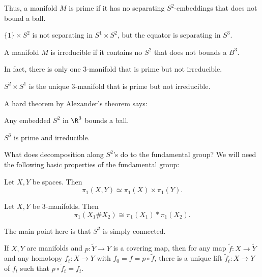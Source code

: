 \documentclass[a4paper]{article}
\begin{document}
Thus, a manifold $M$ is prime if it has no separating $S^2$-embeddings that does not bound a ball.

\begin{eg}
  $\{1\} \times S^2$ is not separating in $S^1 \times S^2$, but the equator is separating in $S^3$.
\end{eg}

\begin{defi}
  A manifold $M$ is irreducible if it contains no $S^2$ that does not bounds a $B^3$.
\end{defi}
In fact, there is only one $3$-manifold that is prime but not irreducible.

\begin{prop}
  $S^2 \times S^1$ is the unique $3$-manifold that is prime but not irreducible.
\end{prop}

A hard theorem by Alexander's theorem says:
\begin{thm}
  Any embedded $S^2$ in $\R^3$ bounds a ball.
\end{thm}

\begin{cor}
  $S^3$ is prime and irreducible.
\end{cor}

What does decomposition along $S^2$'s do to the fundamental group? We will need the following basic properties of the fundamental group:
\begin{thm}
  Let $X, Y$ be spaces. Then
  \[
    \pi_1(X, Y) \simeq \pi_1(X) \times \pi_1(Y).
  \]
\end{thm}

\begin{thm}
  Let $X, Y$ be $3$-manifolds. Then
  \[
    \pi_1(X_1 \# X_2) \cong \pi_1(X_1) * \pi_1(X_2).
  \]
\end{thm}
The main point here is that $S^2$ is simply connected.

\begin{prop}
  If $X, Y$ are manifolds and $p: \tilde{Y} \to Y$ is a covering map, then for any map $\tilde{f}: X \to \tilde{Y}$ and any homotopy $f_t: X \to Y$ with $f_0 = f = p \circ \tilde{f}$, there is a unique lift $\tilde{f}_t: X \to Y$ of $f_t$ such that $p \circ \tilde{f}_t = f_t$.
\end{prop}
\end{document}
